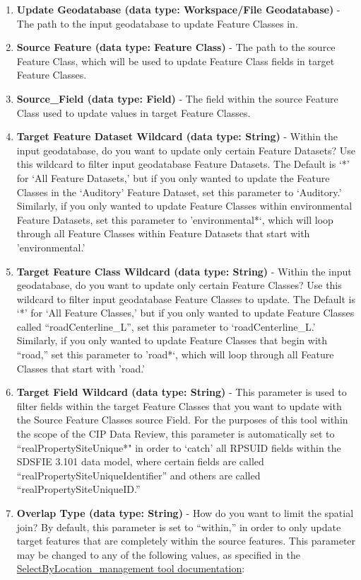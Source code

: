 \documentclass[openany]{book}
\theoremstyle{definition}
\theoremstyle{definition}
\theoremstyle{definition}
\theoremstyle{remark}
\begin{document}
\begin{enumerate}
\def\labelenumi{\arabic{enumi}.}
\item
  \textbf{Update Geodatabase (data type: Workspace/File Geodatabase)} -
  The path to the input geodatabase to update Feature Classes in.
\item
  \textbf{Source Feature (data type: Feature Class)} - The path to the
  source Feature Class, which will be used to update Feature Class
  fields in target Feature Classes.
\item
  \textbf{Source\_Field (data type: Field)} - The field within the
  source Feature Class used to update values in target Feature Classes.
\item
  \textbf{Target Feature Dataset Wildcard (data type: String)} - Within
  the input geodatabase, do you want to update only certain Feature
  Datasets? Use this wildcard to filter input geodatabase Feature
  Datasets. The Default is `*' for `All Feature Datasets,' but if you
  only wanted to update the Feature Classes in the `Auditory' Feature
  Dataset, set this parameter to `Auditory.' Similarly, if you only
  wanted to update Feature Classes within environmental Feature
  Datasets, set this parameter to 'environmental*`, which will loop
  through all Feature Classes within Feature Datasets that start with
  'environmental.'
\item
  \textbf{Target Feature Class Wildcard (data type: String)} - Within
  the input geodatabase, do you want to update only certain Feature
  Classes? Use this wildcard to filter input geodatabase Feature Classes
  to update. The Default is `*' for `All Feature Classes,' but if you
  only wanted to update Feature Classes called ``roadCenterline\_L'',
  set this parameter to `roadCenterline\_L.' Similarly, if you only
  wanted to update Feature Classes that begin with ``road,'' set this
  parameter to 'road*`, which will loop through all Feature Classes that
  start with 'road.'
\item
  \textbf{Target Field Wildcard (data type: String)} - This parameter is
  used to filter fields within the target Feature Classes that you want
  to update with the Source Feature Classes source Field. For the
  purposes of this tool within the scope of the CIP Data Review, this
  parameter is automatically set to ``realPropertySiteUnique*" in order
  to `catch' all RPSUID fields within the SDSFIE 3.101 data model, where
  certain fields are called ``realPropertySiteUniqueIdentifier'' and
  others are called ``realPropertySiteUniqueID.''
\item
  \textbf{Overlap Type (data type: String)} - How do you want to limit
  the spatial join? By default, this parameter is set to ``within,'' in
  order to only update target features that are completely within the
  source features. This parameter may be changed to any of the following
  values, as specified in the
  \href{http://desktop.arcgis.com/en/arcmap/latest/tools/data-management-toolbox/select-layer-by-location.htm}{SelectByLocation\_management
  tool documentation}:


\end{enumerate}
\end{document}
